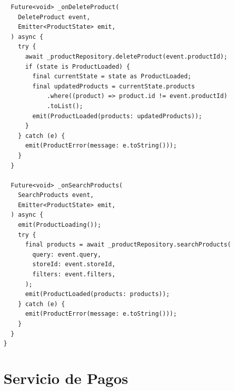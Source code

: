 \documentclass[12pt,a4paper]{report}
\begin{document}
\begin{verbatim}
  Future<void> _onDeleteProduct(
    DeleteProduct event,
    Emitter<ProductState> emit,
  ) async {
    try {
      await _productRepository.deleteProduct(event.productId);
      if (state is ProductLoaded) {
        final currentState = state as ProductLoaded;
        final updatedProducts = currentState.products
            .where((product) => product.id != event.productId)
            .toList();
        emit(ProductLoaded(products: updatedProducts));
      }
    } catch (e) {
      emit(ProductError(message: e.toString()));
    }
  }
  
  Future<void> _onSearchProducts(
    SearchProducts event,
    Emitter<ProductState> emit,
  ) async {
    emit(ProductLoading());
    try {
      final products = await _productRepository.searchProducts(
        query: event.query,
        storeId: event.storeId,
        filters: event.filters,
      );
      emit(ProductLoaded(products: products));
    } catch (e) {
      emit(ProductError(message: e.toString()));
    }
  }
}
\end{verbatim}

\section{Servicio de Pagos}
\end{document}
